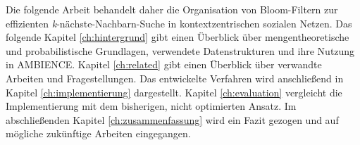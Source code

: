 Die folgende Arbeit behandelt daher die Organisation von Bloom-Filtern zur effizienten \textit{k}-nächste-Nachbarn-Suche in kontextzentrischen sozialen Netzen. Das folgende Kapitel \ref{ch:hintergrund} gibt einen Überblick über mengentheoretische und probabilistische Grundlagen, verwendete Datenstrukturen und ihre Nutzung in AMBIENCE. Kapitel \ref{ch:related} gibt einen Überblick über verwandte Arbeiten und Fragestellungen. Das entwickelte Verfahren wird anschließend in Kapitel \ref{ch:implementierung} dargestellt. Kapitel \ref{ch:evaluation} vergleicht die Implementierung mit dem bisherigen, nicht optimierten Ansatz. Im abschließenden Kapitel \ref{ch:zusammenfassung} wird ein Fazit gezogen und auf mögliche zukünftige Arbeiten eingegangen. 